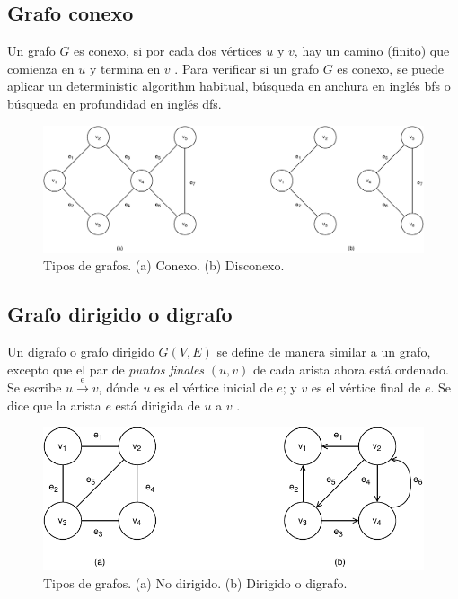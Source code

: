 \subsection{Grafo conexo}
Un grafo \( G \) es conexo, si por cada dos vértices \( u \) y \( v \), hay un camino (finito) que comienza en \( u \) y termina en \( v \) \cite{even2011graph}. Para verificar si un grafo \( G \) es conexo, se puede aplicar un \gls{deterministic algorithm} habitual, búsqueda en anchura en inglés \acrfull{bfs} o búsqueda en profundidad en inglés \acrfull{dfs}.

\begin{figure}[H]
	\centering
	\includegraphics[width=1\linewidth]{document/GraphTheory/images/connected-disconnected-graph}
	\caption{Tipos de grafos. (a) Conexo. (b) Disconexo.}
	\label{fig:connected-disconnected-graph}
\end{figure}

\subsection{Grafo dirigido o digrafo}
Un digrafo o grafo dirigido \( G(V,E) \) se define de manera similar a un grafo, excepto que el par de \textit{puntos finales} \( (u, v) \) de cada arista ahora está ordenado. Se escribe \( u \xrightarrow{\text{e}} v \), dónde \( u \) es el vértice inicial de \( e \); y \( v \) es el vértice final de \( e \). Se dice que la arista \( e \) está dirigida de \( u \) a \( v \) \cite{even2011graph}.

\begin{figure}[H]
	\centering
	\includegraphics[width=0.6\linewidth]{document/GraphTheory/images/directed-undirected-graph}
	\caption{Tipos de grafos. (a) No dirigido. (b) Dirigido o digrafo. }
	\label{fig:directed-undirected-graph}
\end{figure}